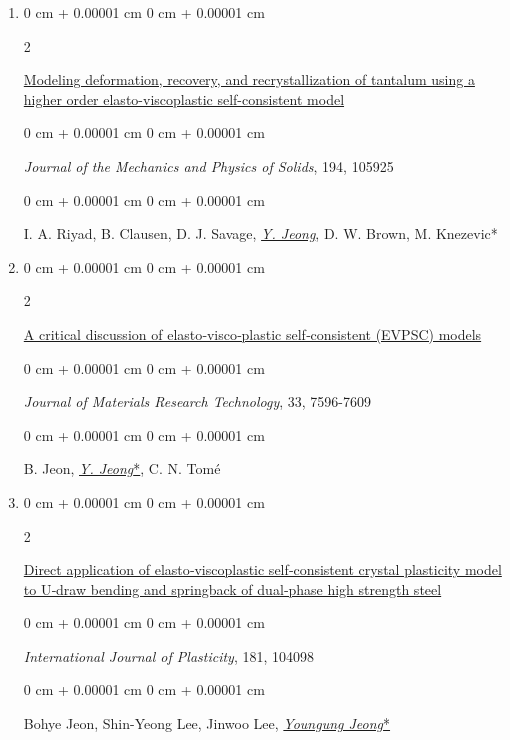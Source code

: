 \documentclass[10pt, letterpaper]{article}
\newenvironment{onecolentry}{
    \begin{adjustwidth}{
        0 cm + 0.00001 cm
    }{
        0 cm + 0.00001 cm
    }
}{
    \end{adjustwidth}
} %
\newenvironment{twocolentry}[2][]{
    \onecolentry
    \def\secondColumn{#2}
    \setcolumnwidth{\fill, 4.5 cm}
    \begin{paracol}{2}
}{
    \switchcolumn \raggedleft \secondColumn
    \end{paracol}
    \endonecolentry
} %
\begin{document}
\begin{enumerate}
        \item
        \begin{twocolentry}{2025}
            \href{https://doi.org/10.1016/j.jmps.2024.105925}{Modeling deformation, recovery, and recrystallization of tantalum using a higher order elasto-viscoplastic self-consistent model}
        \end{twocolentry}
        \begin{onecolentry}
            {\it Journal of the Mechanics and Physics of Solids}, 194, 105925
        \end{onecolentry}
        \begin{onecolentry}
            I. A. Riyad, B. Clausen, D. J. Savage, {\underline{\textit{Y. Jeong}}}, D. W. Brown, M. Knezevic*
        \end{onecolentry}
        \vspace{0.10 cm}

        \item
        \begin{twocolentry}{2024}
            \href{https://doi.org/10.1016/j.jmrt.2024.11.043}{A critical discussion of elasto‑visco‑plastic self‑consistent (EVPSC) models}
        \end{twocolentry}
        \begin{onecolentry}
            {\it Journal of Materials Research Technology}, 33, 7596-7609
        \end{onecolentry}
        \begin{onecolentry}
            B. Jeon, {\underline{\textit{Y. Jeong}*}}, C. N. Tomé
        \end{onecolentry}
        \vspace{0.10 cm}

        \item
        \begin{twocolentry}{2024}
            \href{https://doi.org/10.1016/j.ijplas.2024.104098}{Direct application of elasto‑viscoplastic self‑consistent crystal plasticity model to U‑draw bending and springback of dual‑phase high strength steel}
        \end{twocolentry}
        \begin{onecolentry}
            {\it International Journal of Plasticity}, 181, 104098
        \end{onecolentry}
        \begin{onecolentry}
            Bohye Jeon, Shin-Yeong Lee, Jinwoo Lee, {\underline{\textit{Youngung Jeong}*}}
        \end{onecolentry}
        \vspace{0.10 cm}


\end{enumerate}
\end{document}
